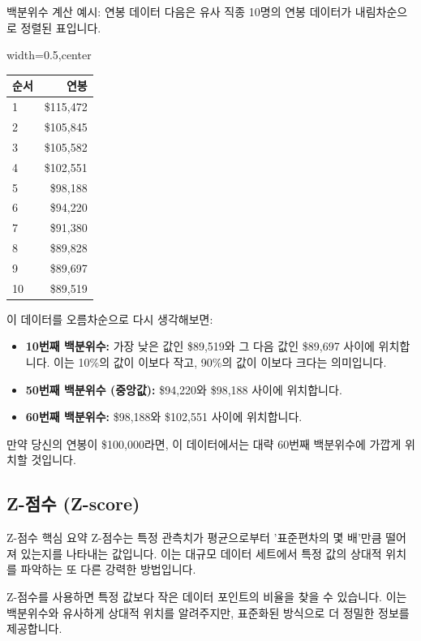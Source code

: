 \documentclass[11pt,a4paper]{article}
\begin{document}
\begin{examplebox}{백분위수 계산 예시: 연봉 데이터}
다음은 유사 직종 10명의 연봉 데이터가 내림차순으로 정렬된 표입니다.

\begin{adjustbox}{width=0.5\textwidth,center}
\begin{tabular}{lr}
\toprule
\textbf{순서} & \textbf{연봉} \\
\midrule
1 & \$115,472 \\
2 & \$105,845 \\
3 & \$105,582 \\
4 & \$102,551 \\
5 & \$98,188 \\
6 & \$94,220 \\
7 & \$91,380 \\
8 & \$89,828 \\
9 & \$89,697 \\
10 & \$89,519 \\
\bottomrule
\end{tabular}
\end{adjustbox}

이 데이터를 오름차순으로 다시 생각해보면:
\begin{itemize}
    \item \textbf{10번째 백분위수:} 가장 낮은 값인 \$89,519와 그 다음 값인 \$89,697 사이에 위치합니다. 이는 10\%의 값이 이보다 작고, 90\%의 값이 이보다 크다는 의미입니다.
    \item \textbf{50번째 백분위수 (중앙값):} \$94,220와 \$98,188 사이에 위치합니다.
    \item \textbf{60번째 백분위수:} \$98,188와 \$102,551 사이에 위치합니다.
\end{itemize}
만약 당신의 연봉이 \$100,000라면, 이 데이터에서는 대략 60번째 백분위수에 가깝게 위치할 것입니다.
\end{examplebox}

\newpage
\subsection{Z-점수 (Z-score)}

\begin{summarybox}{Z-점수 핵심 요약}
Z-점수는 특정 관측치가 평균으로부터 '표준편차의 몇 배'만큼 떨어져 있는지를 나타내는 값입니다. 이는 대규모 데이터 세트에서 특정 값의 상대적 위치를 파악하는 또 다른 강력한 방법입니다.
\end{summarybox}

Z-점수를 사용하면 특정 값보다 작은 데이터 포인트의 비율을 찾을 수 있습니다. 이는 백분위수와 유사하게 상대적 위치를 알려주지만, 표준화된 방식으로 더 정밀한 정보를 제공합니다.
\end{document}
